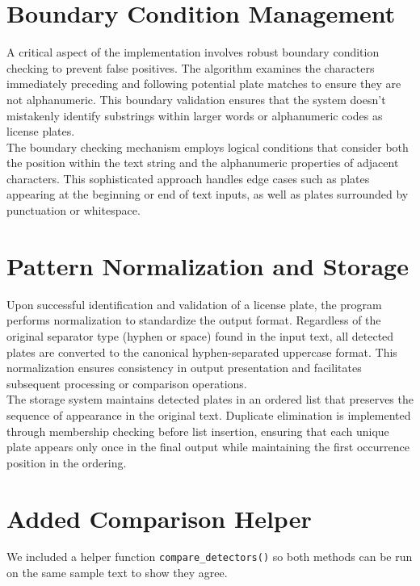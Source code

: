 \documentclass[12pt,a4paper]{article}
\begin{document}
\section{Boundary Condition Management}

A critical aspect of the implementation involves robust boundary condition checking to prevent false positives. The algorithm examines the characters immediately preceding and following potential plate matches to ensure they are not alphanumeric. This boundary validation ensures that the system doesn't mistakenly identify substrings within larger words or alphanumeric codes as license plates.\\[6pt]

\noindent The boundary checking mechanism employs logical conditions that consider both the position within the text string and the alphanumeric properties of adjacent characters. This sophisticated approach handles edge cases such as plates appearing at the beginning or end of text inputs, as well as plates surrounded by punctuation or whitespace.

\section{Pattern Normalization and Storage}

Upon successful identification and validation of a license plate, the program performs normalization to standardize the output format. Regardless of the original separator type (hyphen or space) found in the input text, all detected plates are converted to the canonical hyphen-separated uppercase format. This normalization ensures consistency in output presentation and facilitates subsequent processing or comparison operations.\\[6pt]

\noindent The storage system maintains detected plates in an ordered list that preserves the sequence of appearance in the original text. Duplicate elimination is implemented through membership checking before list insertion, ensuring that each unique plate appears only once in the final output while maintaining the first occurrence position in the ordering.

\section{Added Comparison Helper}
We included a helper function \texttt{compare\_detectors()} so both methods can be run on the same sample text to show they agree.
\end{document}
